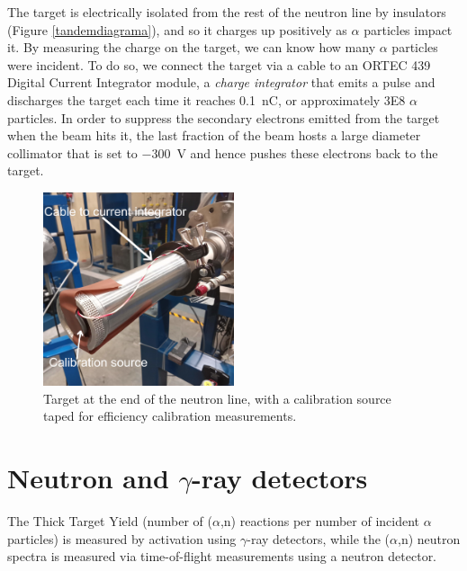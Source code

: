\documentclass[a4paper,12pt]{report}
\newcommand{\an}{($\alpha$,n) }
\begin{document}
The target is electrically isolated from the rest of the neutron line by insulators (Figure \ref{tandemdiagrama}), and so it charges up positively as $\alpha$ particles impact it.
By measuring the charge on the target, we can know how many $\alpha$ particles were incident.
To do so, we connect the target via a cable to an ORTEC 439 Digital Current Integrator module, a \textit{charge integrator} that emits a pulse and discharges the target each time it reaches \qty{0.1}{\nano\coulomb}, or approximately \num{3E8} $\alpha$ particles.
In order to suppress the secondary electrons emitted from the target when the beam hits it, the last fraction of the beam hosts a large diameter collimator that is set to \qty{-300}{\V} and hence pushes these electrons back to the target.

\begin{figure}[H]
	\centering
	\includegraphics[width=0.5\textwidth]{target_with_calibration.jpg}
	\caption{Target at the end of the neutron line, with a calibration source taped for efficiency calibration measurements.}
	\label{target_photo}
\end{figure}

\section{Neutron and $\gamma$-ray detectors}
The Thick Target Yield (number of \an reactions per number of incident $\alpha$ particles) is measured by activation using $\gamma$-ray detectors, while the \an neutron spectra is measured via time-of-flight measurements using a neutron detector.
\\
\end{document}
